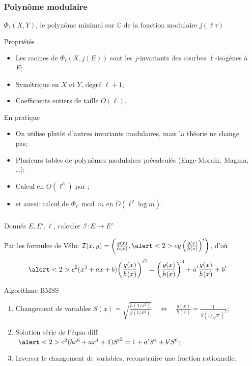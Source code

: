 \documentclass[10pt]{beamer}
\newcommand{\C}{\mathbb{C}}  %
\newcommand{\0}{\mathcal{O}}  %
\newcommand{\isog}[1]{\mathcal{#1}}  %
\newcommand{\I}{\isog{I}}  %
\newcommand{\tildO}{\tilde{O}}  %
\begin{document}
\begin{frame}
  \frametitle{Polynôme modulaire}

  \begin{center}
    $\Phi_\ell(X,Y)$, le polynôme minimal sur $\C$ de la fonction
    modulaire $j(\ell\tau)$
  \end{center}

  \begin{block}{Propriétés}
    \begin{itemize}
    \item Les racines de $\Phi_\ell(X,j(E))$ sont les $j$-invariants
      des courbes $\ell$-isogènes à $E$;
    \item Symétrique en $X$ et $Y$, degré $\ell+1$;
    \item Coefficients entiers de taille $O(\ell)$.
    \end{itemize}
  \end{block}

  \begin{block}{En pratique}
    \begin{itemize}
    \item On utilise plutôt d'autres invariants modulaires, mais la théorie ne change pas;
    \item Plusieurs tables de polynômes modulaires précalculés (Enge-Morain, Magma, \dots);
    \item Calcul en \alert{$\tildO(\ell^3)$} par \cite{sutherland10:modpol};
    \item et aussi: calcul de $\Phi_\ell \bmod m$ en \alert{$\tildO(\ell^2\log m)$}.
    \end{itemize}
  \end{block}
\end{frame}


\begin{frame}
  \frametitle{\cite{bostan+morain+salvy+schost08}}

  \begin{center}
    \Large
    Donnés $E, E', \ell$, calculer $\I:E\to E'$
  \end{center}

  Par les formules de Vélu:
  $\I(x,y) = \left(\frac{g(x)}{h(x)}, \alert<2>{c}y\left(\frac{g(x)}{h(x)}\right)'\right)$,
  d'où
  \[\alert<2>{c^2}(x^3 + ax + b){\left(\frac{g(x)}{h(x)}\right)'}^2 =
  \left(\frac{g(x)}{h(x)}\right)^3 + a'\frac{g(x)}{h(x)} + b'\]
  
  \begin{block}{Algorithme BMSS}
    \begin{enumerate}
    \item Changement de variables $ S(x) =
      \sqrt{\frac{h(1/x^2)}{g(1/x^2)}} \quad\Leftrightarrow\quad
      \frac{g(x)}{h(x)} = \frac{1}{S(1/\sqrt{x})^2}$;
    \item Solution série de l'équa diff $\;\alert<2>{c^2}(bx^6 + ax^4 +
      1){S'}^2 = 1 + a'S^4 + b'S^6$;
    \item Inverser le changement de variables, reconstruire une
      fraction rationnelle.
    \end{enumerate}
  \end{block}
\end{frame}
\end{document}
